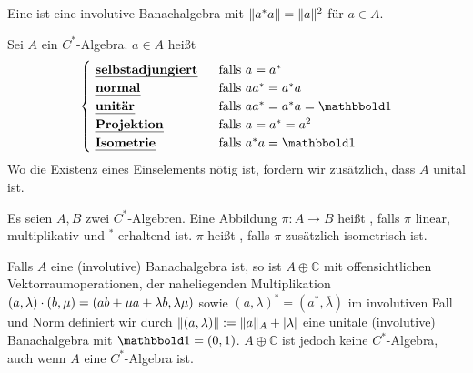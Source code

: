\begin{definition}[{name=[$C^*$-Algebra]},label=def:22]
	Eine  ist eine involutive Banachalgebra mit $\norm{a^*a}= \norm{a}^2$ für $a \in A$.
\end{definition}

\begin{definition}[{name=[{selbstadjungiert, normal, unitär, Projektion, Isometrie}]}]
	Sei $A$ ein $C^*$-Algebra. $a \in A$ heißt 
	\[
		\begin{cases}
			\text{ \Index{selbstadjungiert} }  &\text{ falls } a=a^*\\
			\text{ \Index{normal} }  &\text{ falls }  aa^*=a^*a \\
			\text{ \Index{unitär} }  &\text{ falls }  aa^*=a^*a=\ind \\
			\text{ \Index{Projektion} }  &\text{ falls }   a=a^*=a^2 \\
			\text{ \Index{Isometrie} }  &\text{ falls } a^*a= \ind  
		\end{cases}
	\]
	Wo die Existenz eines Einselements nötig ist, fordern wir zusätzlich, dass $A$ unital ist.
\end{definition}

\begin{definition}[{name=[${ }^*$-Homomorphismus]}]
	Es seien $A,B$ zwei $C^*$-Algebren. Eine Abbildung $\pi \colon A \to B$ heißt , falls $\pi$ 
	linear, multiplikativ und ${}^*$-erhaltend ist. $\pi$ heißt
	, falls $\pi$ zusätzlich isometrisch ist. 
\end{definition}

\begin{bemerkung}[{name=[Direkte Summe von $A$ mit den komplexen Zahlen]}]
	Falls $A$ eine (involutive) Banachalgebra ist, so ist $A \oplus \mathbb{C}$ mit offensichtlichen Vektorraumoperationen, der naheliegenden Multiplikation
	$(a,\lambda) \cdot (b,\mu) = \enbrace*{ab + \mu a + \lambda b, \lambda \mu}$ sowie $(a,\lambda)^* = (a^*,\overline{\lambda})$ im involutiven Fall und Norm definiert wir durch
	$\norm{(a,\lambda)}:= \norm{a}_{A} + \abs{\lambda}$ eine unitale (involutive) Banachalgebra mit $\ind=(0,1)$. $A \oplus \mathbb{C}$ ist jedoch keine $C^*$-Algebra, auch wenn
	$A$ eine $C^*$-Algebra ist.
\end{bemerkung}

